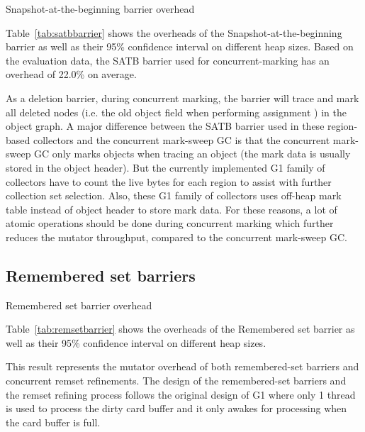 \begin{table*}
  \centering
  
  \caption{Snapshot-at-the-beginning barrier overhead}
  \label{tab:satbbarrier}
\end{table*}

Table~\ref{tab:satbbarrier} shows the overheads of the Snapshot-at-the-beginning barrier
as well as their 95\% confidence interval on different heap sizes.
Based on the evaluation data, the SATB barrier used for concurrent-marking
has an overhead of 22.0\% on average.

As a deletion barrier, during concurrent marking, the barrier will trace and mark
all deleted nodes (i.e. the old object field when performing assignment ) in the object graph.
A major difference between the SATB barrier used in these region-based collectors and
the concurrent mark-sweep GC is that the concurrent mark-sweep GC only marks objects
when tracing an object (the mark data is usually stored in the object header).
But the currently implemented G1 family of collectors have to count the live bytes
for each region to assist with further collection set selection.
Also, these G1 family of collectors uses off-heap mark table instead of object header to store
mark data. For these reasons, a lot of atomic operations should be done during concurrent
marking which further reduces the mutator throughput, compared to the concurrent mark-sweep GC.

\subsection{Remembered set barriers}

\begin{table*}
  \centering
  
  \caption{Remembered set barrier overhead}
  \label{tab:remsetbarrier}
\end{table*}

Table~\ref{tab:remsetbarrier} shows the overheads of the Remembered set barrier
as well as their 95\% confidence interval on different heap sizes.

This result represents the mutator overhead of both remembered-set barriers and concurrent remset refinements.
The design of the remembered-set barriers and the remset refining process follows
the original design of G1 where only 1 thread is used to process the dirty card
buffer and it only awakes for processing when the card buffer is full.

